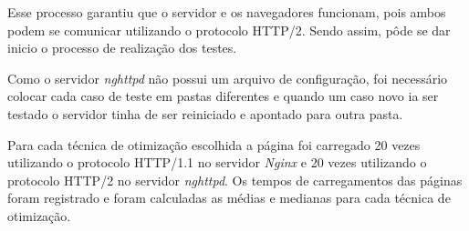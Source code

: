 Esse processo garantiu que o servidor e os navegadores funcionam, pois ambos podem se comunicar utilizando o protocolo HTTP/2. Sendo assim, pôde se dar inicio o processo de realização dos testes.

Como o servidor \textit{nghttpd} não possui um arquivo de configuração, foi necessário colocar cada caso de teste em pastas diferentes e quando um caso novo ia ser testado o servidor tinha de ser reiniciado e apontado para outra pasta.

Para cada técnica de otimização escolhida a página foi carregado 20 vezes utilizando o protocolo HTTP/1.1 no servidor \textit{Nginx} e 20 vezes utilizando o protocolo HTTP/2 no servidor \textit{nghttpd}. Os tempos de carregamentos das páginas foram registrado e foram calculadas as médias e medianas para cada técnica de otimização.
